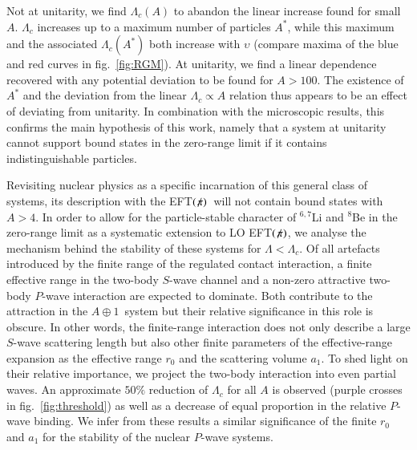 \documentclass[preprint,12pt]{elsarticle}
\newcommand{\lc}{\ensuremath{\Lambda_c}}
\newcommand{\abb}{\mbox{\ensuremath{A\oplus 1}}}
\newcommand{\eftnopi}{\mbox{EFT$(\not \! \pi)$}}
\newcommand{\figref}[1]{fig.~\ref{#1}}
\begin{document}
Not at unitarity, we find $\lc(A)$ to abandon the linear increase found for small $A$.
$\lc$ increases up to a maximum number of particles $A^*$, while this maximum and the associated $\lc(A^*)$
both increase with $\upsilon$ (compare maxima of the blue and red curves in fig.~\ref{fig:RGM}). At unitarity,
we find a linear dependence recovered with any potential deviation to be found for $A>100$.
The existence of $A^*$ and the deviation from the linear $\Lambda_c\propto A$ relation thus appears to be an effect of deviating from unitarity.
In combination with the microscopic results, this confirms the main hypothesis of this work, namely that a system at unitarity cannot
support bound states in the zero-range limit if it contains indistinguishable particles.

Revisiting nuclear physics as a specific incarnation of this general class of systems,
its description with the \eftnopi~will not contain bound states with $A>4$.
In order to allow for the particle-stable character of $^{6,7}$Li and $^8$Be in the zero-range limit as a systematic
extension to LO \eftnopi, we analyse the mechanism behind the stability of these systems for $\Lambda<\lc$.
Of all artefacts introduced by the finite range of the regulated contact interaction,
a finite effective range in the two-body $S$-wave channel and a non-zero attractive two-body $P$-wave interaction are expected to dominate. 
Both contribute to the attraction in the \abb~system but their relative significance in this role is obscure.
In other words, the finite-range interaction does not only describe a large $S$-wave scattering length but
also other finite parameters of the effective-range expansion as the effective range $r_0$ and the scattering volume $a_1$.
To shed light on their relative importance, we project the two-body interaction into even partial waves.
An approximate $50\%$ reduction of $\lc$ for all $A$ is observed (purple crosses in \figref{fig:threshold})
as well as a decrease of equal proportion in the relative $P$-wave binding.
We infer from these results a similar significance of the finite $r_0$ and $a_1$ for the stability of the nuclear $P$-wave systems.
%
\end{document}
